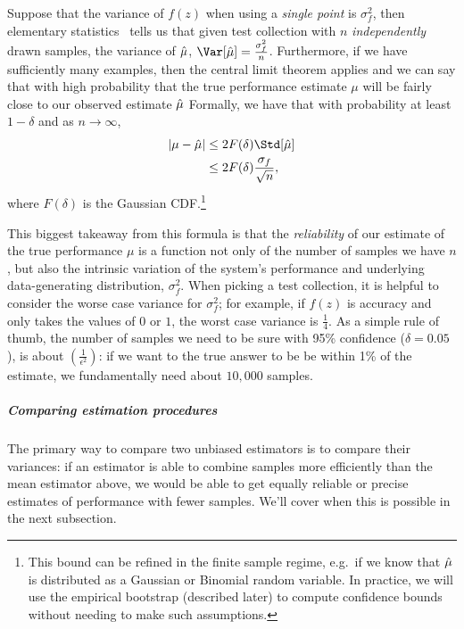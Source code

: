 Suppose that the variance of $f(z)$ when using a \textit{single point} is $\sigma^2_f$, then
elementary statistics~\citep{casella1990statistical} tells us that given test collection with $n$ \textit{independently} drawn samples, the variance of $\hat{\mu}$, $\Var[\muh] = \frac{\sigma^2_f}{n}$.
Furthermore, if we have sufficiently many examples, then the central limit theorem applies and we can say that with high probability that the true performance estimate $\mu$ will be fairly close to our observed estimate $\hat{\mu}$
Formally, we have that with probability at least $1 - \delta$ and as $n \to \infty$,
\begin{align*}
  |\mu - \muh| &\le 2F(\delta) \Std[\muh] \\
  &\le 2F(\delta) \frac{\sigma_f}{\sqrt{n}},
\end{align*}
where $F(\delta)$ is the Gaussian CDF.\@\footnote{%
  This bound can be refined in the finite sample regime, e.g.\ if we know that $\hat{\mu}$ is distributed as a Gaussian or Binomial random variable.
  In practice, we will use the empirical bootstrap (described later) to compute confidence bounds without needing to make such assumptions.
}

This biggest takeaway from this formula is that the \textit{reliability} of our estimate of the true performance $\mu$ is a function not only of the number of samples we have $n$, but also the intrinsic variation of the system's performance and underlying data-generating distribution, $\sigma^2_f$.
When picking a test collection, it is helpful to consider the worse case variance for $\sigma^2_f$; for example, if $f(z)$ is accuracy and only takes the values of $0$ or $1$, the worst case variance is $\frac{1}{4}$.
As a simple rule of thumb, the number of samples we need to be sure with 95\% confidence ($\delta = 0.05$), is about $(\frac{1}{\epsilon^2})$: if we want to the true answer to be be within 1\% of the estimate, we fundamentally need about $10,000$ samples.

\subparagraph{Comparing estimation procedures}
The primary way to compare two unbiased estimators is to compare their variances: if an estimator is able to combine samples more efficiently than the mean estimator above, we would be able to get equally reliable or precise estimates of performance with fewer samples.
We'll cover when this is possible in the next subsection.


